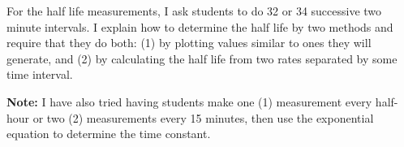 For the half life measurements, I ask students to do 32 or 34 successive two minute intervals. I explain how to determine the half life by two methods and require that they do both: (1) by plotting values similar to ones they will generate, and (2) by calculating the half life from two rates separated by some time interval.

\textbf{Note:} I have also tried having students make one (1) measurement every half-hour or two (2) measurements every 15 minutes, then use the exponential equation to determine the time constant.

\begin{comment}

\chapter{Laboratory Report Format} \label{a:rptformat}
\section{Laboratory and Results Overview}
Name (and Lab Partners):\hspace{2.61in} Date:\\
Section:. \hspace{3.75in} Day:\\
The report should also have a title which is usually the laboratory name and number.

\noindent \textbf{Lab Objective:} Write a single sentence or short paragraph, in your own words, stating the objective of the laboratory.\\
\textbf{Lab Overview:} Summarize in a single sentence or short paragraph the outcome of your lab experiment.
\begin{itemize}[itemsep=0pt]
	\item Often this will be a brief statement of how closely your observations or measurements agreed with or were consistent with predictions from a hypothesis, theory, or formula.
	\item Many labs involve observation of phenomena, so that your results might list or state your new understanding of the physical phenomena that you gained by doing the lab.
\end{itemize}

\section{Procedure}
\textbf{Equipment:} Provide a sketch of the setup of the major pieces of equipment and their arrangement.\\
\textbf{Experimental Procedure:} Summarize in a sentence or brief paragraph any exceptional procedures, techniques, or methods used during the lab.


\end{comment}
